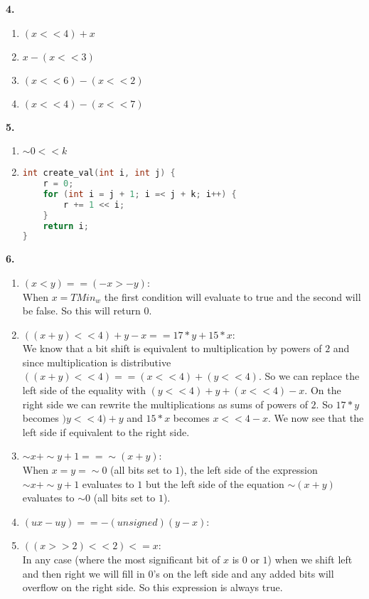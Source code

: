 \documentclass[11pt]{article} %
\begin{document}
{\bf 4.}

\begin{enumerate}[label=\alph*)]
\item $(x << 4) + x$
\item $x - (x << 3)$
\item $(x << 6) - (x << 2)$
\item $(x << 4) - (x << 7)$
\end{enumerate}


\vspace{0.5in}
{\bf 5.}

\begin{enumerate}[label=\alph*)]

\item
$ \sim 0 << k$

\item
\begin{lstlisting}[language=C]
int create_val(int i, int j) {
	r = 0;
	for (int i = j + 1; i =< j + k; i++) {
		r += 1 << i;
	}
	return i;
}
\end{lstlisting}
\end{enumerate}

\pagebreak
{\bf 6.}
\begin{enumerate}[label=\alph*)]
\item
$(x < y) == (-x > -y)$: \\
When $x = TMin_w$ the first condition will evaluate to true and the second will be false. So this will return $0$.

\item
$((x+y)<<4) + y-x == 17*y+15*x$: \\
We know that a bit shift is equivalent to multiplication by powers of $2$ and since multiplication is distributive $((x+y)<<4) == (x << 4) + (y << 4)$. So we can replace the left side of the equality with $(y << 4) + y + (x << 4) - x$.  On the right side we can rewrite the multiplications as sums of powers of $2$. So $17*y$ becomes $)y << 4) + y$ and $15*x$ becomes $x << 4 - x$. We now see that the left side if equivalent to the right side.

\item
$\sim x+ \sim y+1 == \sim (x+y)$: \\
When $x = y = \sim 0$ (all bits set to $1$), the left side of the expression $\sim x+ \sim y+1$ evaluates to $1$ but the left side of the equation $\sim (x + y)$ evaluates to $\sim 0$ (all bits set to $1$).

\item
$(ux-uy) == -(unsigned)(y-x)$:


\item
$((x >> 2) << 2) <= x$: \\
In any case (where the most significant bit of $x$ is $0$ or $1$) when we shift left and then right we will fill in $0$'s on the left side and any added bits will overflow on the right side. So this expression is always true.

\end{enumerate}
\end{document}
